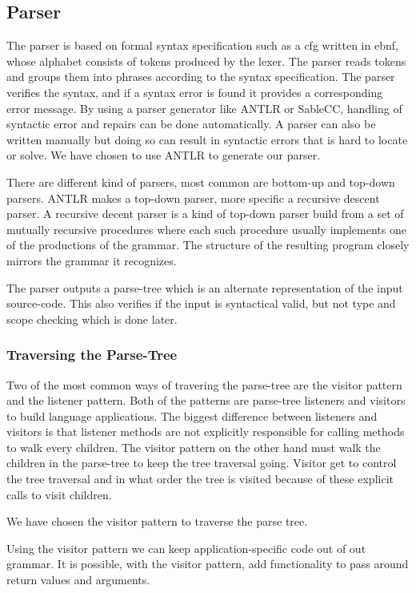 \subsection*{Parser}
The parser is based on formal syntax specification such as a \acrfull{cfg} written in \acrfull{ebnf}, whose alphabet consists of tokens produced by the lexer. 
The parser reads tokens and groups them into phrases according to the syntax specification.
The parser verifies the syntax, and if a syntax error is found it provides a corresponding error message. \citep{Crafting_book}
By using a parser generator like ANTLR or SableCC, handling of syntactic error and repairs can be done automatically.
A parser can also be written manually but doing so can result in syntactic errors that is hard to locate or solve.
We have chosen to use ANTLR to generate our parser.

There are different kind of parsers, most common are bottom-up and top-down parsers.
ANTLR makes a top-down parser, more specific a recursive descent parser.
A recursive decent parser is a kind of top-down parser build from a set of mutually recursive procedures where each such procedure usually implements one of the productions of the grammar.
The structure of the resulting program closely mirrors the grammar it recognizes. \citep{Recursive_programming}

The parser outputs a parse-tree which is an alternate representation of the input source-code. 
This also verifies if the input is syntactical valid, but not type and scope checking which is done later. 

\subsubsection*{Traversing the Parse-Tree}
Two of the most common ways of travering the parse-tree are the visitor pattern and the listener pattern. 
Both of the patterns are parse-tree listeners and visitors to build language applications.
The biggest difference between listeners and visitors is that listener methods are not explicitly responsible for calling methods to walk every children.
The visitor pattern on the other hand must walk the children in the parse-tree to keep the tree traversal going.
Visitor get to control the tree traversal and in what order the tree is visited because of these explicit calls to visit children. \citep{ANTLR4_Book}

We have chosen the visitor pattern to traverse the parse tree. 

Using the visitor pattern we can keep application-specific code out of out grammar.
It is possible, with the visitor pattern, add functionality to pass around return values and arguments.
